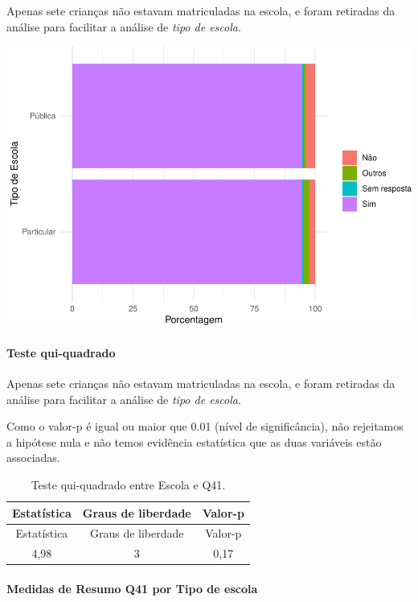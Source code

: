 \documentclass[]{article}
\let\oldparagraph\paragraph
\renewcommand{\paragraph}[1]{\oldparagraph{#1}\mbox{}}
\begin{document}
Apenas sete crianças não estavam matriculadas na escola, e foram retiradas da análise para facilitar a análise de \emph{tipo de escola}.

\begin{center}\includegraphics[width=0.75\linewidth]{relatorio_covid19_files/figure-latex/unnamed-chunk-1647-1} \end{center}

\hypertarget{teste-qui-quadrado-141}{%
\paragraph{Teste qui-quadrado}\label{teste-qui-quadrado-141}}

Apenas sete crianças não estavam matriculadas na escola, e foram retiradas da análise para facilitar a análise de \emph{tipo de escola}.

Como o valor-p é igual ou maior que 0.01 (nível de significância), não rejeitamos a hipótese nula e não temos evidência estatística que as duas variáveis estão associadas.

\begin{longtable}[]{@{}ccc@{}}
\caption{\label{tab:unnamed-chunk-1649}Teste qui-quadrado entre Escola e Q41.}\tabularnewline
\toprule
Estatística & Graus de liberdade & Valor-p\tabularnewline
\midrule
\endfirsthead
\toprule
Estatística & Graus de liberdade & Valor-p\tabularnewline
\midrule
\endhead
4,98 & 3 & 0,17\tabularnewline
\bottomrule
\end{longtable}

\cleardoublepage

\hypertarget{medidas-de-resumo-q41-por-tipo-de-escola}{%
\paragraph{Medidas de Resumo Q41 por Tipo de escola}\label{medidas-de-resumo-q41-por-tipo-de-escola}}
\end{document}
